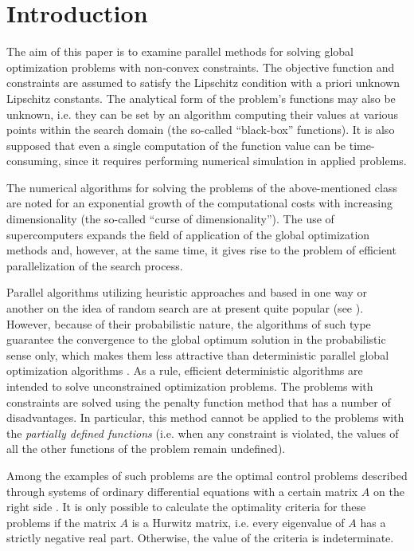 \documentclass[smallextended]{svjour3}       %
\begin{document}
\section{Introduction}
\label{intro}

The aim of this paper is to examine parallel methods for solving global optimization problems with non-convex constraints. The objective function and constraints are assumed to satisfy the Lipschitz condition with a priori unknown Lipschitz constants. The analytical form of the problem’s functions may also be unknown, i.e. they can be set by an algorithm computing their values at various points within the search domain (the so-called ``black-box'' functions). It is also supposed that even a single computation of the function value can be time-consuming, since it requires performing numerical simulation in applied problems. 

The numerical algorithms for solving the problems of the above-mentioned class are noted for an exponential growth of the computational costs with increasing dimensionality (the so-called ``curse of dimensionality''). The use of supercomputers expands the field of application of the global optimization methods and, however, at the same time, it gives rise to the problem of efficient parallelization of the search process.

Parallel algorithms utilizing heuristic approaches and based in one way or another on the idea of random search are at present quite popular (see \cite{RefFerreiro,RefZhu,Korosec,Guerrero}). However, because of their probabilistic nature, the algorithms of such type guarantee the convergence to the global optimum solution in the probabilistic sense only, which makes them less attractive than deterministic parallel global optimization algorithms \cite{Jones2001,Paulavicius2011,Evtushenko2013}. As a rule, efficient deterministic algorithms are intended to solve unconstrained optimization problems. The problems with constraints are solved using the penalty function method that has a number of disadvantages. In particular, this method cannot be applied to the problems with the \textit{partially defined functions} (i.e. when any constraint is violated, the values of all the other functions of the problem remain undefined).

Among the examples of such problems are the optimal control problems described through systems of ordinary differential equations with a certain matrix $A$ on the right side \cite{Balandin2011,Balandin2017}. It is only possible to calculate the optimality criteria for these problems if the matrix $A$ is a Hurwitz matrix, i.e. every eigenvalue of $A$ has a strictly negative real part. Otherwise, the value of the criteria is indeterminate.
\end{document}
